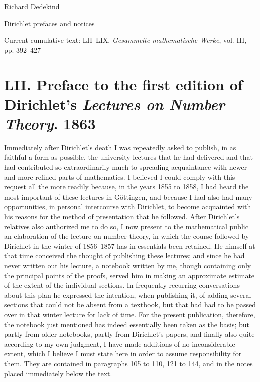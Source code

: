 \documentclass[11pt]{article}
\newcommand{\origpage}[1]{\par\vspace{0.25em}\noindent{\footnotesize\itshape [Printed page #1]}\par\vspace{0.25em}}
\begin{document}
\begin{center}
{\Large Richard Dedekind}\par\vspace{0.3em}
{\large Dirichlet prefaces and notices}\par\vspace{0.2em}
{\normalsize Current cumulative text: LII--LIX, \textit{Gesammelte mathematische Werke}, vol. III, pp. 392--427}\par
\end{center}
\vspace{0.7em}
\origpage{392}
\section*{LII. Preface to the first edition of Dirichlet's \textit{Lectures on Number Theory}. 1863}

Immediately after Dirichlet's death I was repeatedly asked to publish, in as faithful a form as possible, the university lectures that he had delivered and that had contributed so extraordinarily much to spreading acquaintance with newer and more refined parts of mathematics. I believed I could comply with this request all the more readily because, in the years 1855 to 1858, I had heard the most important of these lectures in Göttingen, and because I had also had many opportunities, in personal intercourse with Dirichlet, to become acquainted with his reasons for the method of presentation that he followed. After Dirichlet's relatives also authorized me to do so, I now present to the mathematical public an elaboration of the lecture on number theory, in which the course followed by Dirichlet in the winter of 1856--1857 has in essentials been retained. He himself at that time conceived the thought of publishing these lectures; and since he had never written out his lecture, a notebook written by me, though containing only the principal points of the proofs, served him in making an approximate estimate of the extent of the individual sections. In frequently recurring conversations about this plan he expressed the intention, when publishing it, of adding several sections that could not be absent from a textbook, but that had had to be passed over in that winter lecture for lack of time. For the present publication, therefore, the notebook just mentioned has indeed essentially been taken as the basis; but partly from older notebooks, partly from Dirichlet's papers, and finally also quite according to my own judgment, I have made additions of no inconsiderable extent, which I believe I must state here in order to assume responsibility for them. They are contained in paragraphs 105 to 110, 121 to 144, and in the notes placed immediately below the text.
\end{document}
